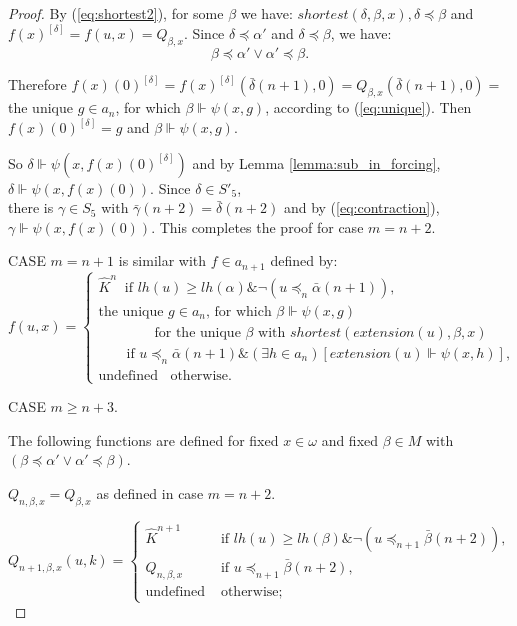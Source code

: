 \documentclass{asl}
\theoremstyle{definition}
\begin{document}
\begin{proof}
By (\ref{eq:shortest2}), for some $\beta$ we have: $shortest(\delta,\beta,x),\delta\preccurlyeq\beta$ and $f(x)^{[\delta]}=f(u,x)=Q_{\beta, x}$. Since $\delta\preccurlyeq\alpha'$ and $\delta\preccurlyeq\beta$, we have: 
\[\beta\preccurlyeq\alpha' \vee \alpha'\preccurlyeq \beta.\]

Therefore $f(x)(0)^{[\delta]}=f(x)^{[\delta]}(\bar{\delta}(n+1),0)=Q_{\beta, x}(\bar{\delta}(n+1),0)=$ the unique $g\in a_n$, for which $\beta \Vdash \psi(x,g)$, according to (\ref{eq:unique}). Then $f(x)(0)^{[\delta]}=g$ and $\beta \Vdash \psi(x,g)$. 

So $\delta \Vdash \psi(x,f(x)(0)^{[\delta]})$ and by Lemma \ref{lemma:sub_in_forcing}, 
$\delta \Vdash \psi(x,f(x)(0))$. Since $\delta\in S'_5$, 
\smallskip
\\there is $\gamma\in S_5$ with $\bar{\gamma}(n+2)=\bar{\delta}(n+2)$ and by (\ref{eq:contraction}), $\gamma \Vdash \psi(x,f(x)(0))$. This completes the proof for case $m=n+2$.
\smallskip

CASE $m=n+1$ is similar with $f\in a_{n+1}$ defined by:
\begin{displaymath}
f(u,x)=
\begin{cases}
\widehat{K}^n \: \text{ if } lh(u)\geqslant lh(\alpha) \& \neg(u\preccurlyeq_{n}\bar{\alpha}({n+1})),\\
\text{the unique }g\in a_n\text{, for which }\beta\Vdash \psi(x,g)\\ 
\qquad \qquad\text{for the unique } \beta \text{ with }  shortest(extension(u),\beta,x)\\ 
\qquad \text{if } u\preccurlyeq_n\bar{\alpha}(n+1) \& (\exists h\in a_n)\left[extension(u)\Vdash \psi(x,h)\right],\\ 
\text{undefined } \: \text{ otherwise.}
\end{cases}
\end{displaymath} 
\medskip

CASE $m\geqslant n+3$. 

The following functions are defined for fixed $x\in \omega$ and fixed $\beta\in M$ with $(\beta \preccurlyeq \alpha'\vee \alpha' \preccurlyeq \beta)$. 

$Q_{n,\beta, x}=Q_{\beta, x}$ as defined in case $m=n+2$.

\begin{displaymath}
Q_{n+1,\beta,x}(u,k)=
\begin{cases}
\widehat{K}^{n+1} & \text{if } lh(u)\geqslant lh(\beta) \& \neg(u\preccurlyeq_{n+1}\bar{\beta}(n+2)),\\
Q_{n,\beta, x}  & \text{if } u\preccurlyeq_{n+1}\bar{\beta}(n+2),\\
\text{undefined } & \text{otherwise;}
\end{cases}
\end{displaymath} 


\end{proof}
\end{document}
